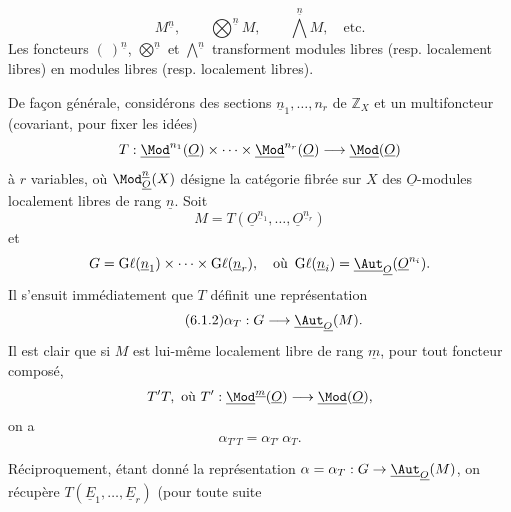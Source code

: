 
\begin{equation}\tag{6.1.1}
 M^{\underline{n}},\qquad \bigotimes^{\underline{n}} M,\qquad \bigwedge^{\underline{n}} M,\quad\text{etc.}
\end{equation}
Les
foncteurs \((\ )^{\underline{n}}\), \(\bigotimes\limits^{\underline{n}}\) et \(\bigwedge\limits^{\underline{n}}\) transforment modules libres (resp. localement libres) en modules libres (resp. localement libres).

De façon générale, considérons des sections \(\underline{n}_1,\ldots,n_r\) de \(\mathbb Z_X\) et un multifoncteur (covariant, pour fixer les idées)
\[
 T:\underline{\Mod}^{n_1}(\underline{O})\times\cdots\times
 \underline{\Mod}^{n_r}(\underline{O})\longrightarrow\underline{\Mod}(\underline{O})
\]
à \(r\) variables, où \(\Mod_{\underline{O}}^{\underline{n}}(X)\) désigne la catégorie fibrée sur \(X\) des \(\underline{O}\)-modules localement libres de rang \(\underline{n}\). Soit
\[
 M=T(\underline{O}^{\underline{n}_1},\ldots,\underline{O}^{\underline{n}_r})
\]
et
\[
 G=\operatorname{G\ell}(\underline{n}_1)\times\cdots\times\operatorname{G\ell}(\underline{n}_r),
 \quad\text{où }\operatorname{G\ell}(\underline{n}_i)=\underline{\Aut}_{\underline{O}}(\underline{O}^{n_i}).
\]
Il s'ensuit immédiatement que \(T\) définit une représentation
\begin{equation}\tag{6.1.2}
 \alpha_T:G\longrightarrow\underline{\Aut}_{\underline{O}}(M).
\end{equation}
Il est clair que si \(M\) est lui-même localement libre de rang \(\underline{m}\), pour tout foncteur composé,
\[
 T'T,\ \text{où } T':\underline{\Mod}^{\underline{m}}(\underline{O})\longrightarrow\underline{\Mod}(\underline{O}),
\]
on a
\begin{equation}\tag{6.1.3}
 \alpha_{T'T}=\alpha_{T'}\,\alpha_T.
\end{equation}

Réciproquement, étant donné la représentation \(\alpha=\alpha_T:G\to\underline{\Aut}_{\underline{O}}(M)\), on récupère \(T(\underline{E}_1,\ldots,\underline{E}_r)\) (pour toute suite

